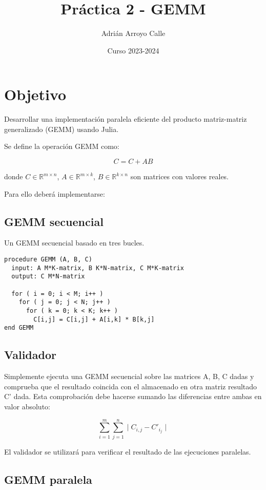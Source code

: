 \documentclass[a4paper]{article}
\author{Adrián Arroyo Calle}
\date{Curso 2023-2024}
\title{Práctica 2 - GEMM}
\begin{document}
\maketitle

\section{Objetivo}
\label{sec:orgc79d51e}

Desarrollar una implementación paralela eficiente del producto matriz-matriz generalizado (GEMM) usando Julia.

Se define la operación GEMM como:

$$
C = C + AB
$$

donde \(C \in \mathbb{R}^{m \times n}\), \(A \in \mathbb{R}^{m \times k}\), \(B \in \mathbb{R}^{k \times n}\) son matrices con valores reales.

Para ello deberá implementarse:

\subsection{GEMM secuencial}
\label{sec:orgecab180}

Un GEMM secuencial basado en tres bucles.

\begin{verbatim}
procedure GEMM (A, B, C)
  input: A M*K-matrix, B K*N-matrix, C M*K-matrix
  output: C M*N-matrix

  for ( i = 0; i < M; i++ )
    for ( j = 0; j < N; j++ )
      for ( k = 0; k < K; k++ )
        C[i,j] = C[i,j] + A[i,k] * B[k,j]
end GEMM
\end{verbatim}

\subsection{Validador}
\label{sec:orga1acf26}

Simplemente ejecuta una GEMM secuencial sobre las matrices A, B, C dadas
y comprueba que el resultado coincida con el almacenado en otra matriz resultado C'
dada. Esta comprobación debe hacerse sumando las diferencias entre ambas en valor absoluto:

$$
\sum_{i=1}^{m}\sum_{j=1}^{n} \mid C_{i,j} - C'_{i_j} \mid
$$

El validador se utilizará para verificar el resultado
de las ejecuciones paralelas.

\subsection{GEMM paralela}
\label{sec:orgc5d538e}
\end{document}
